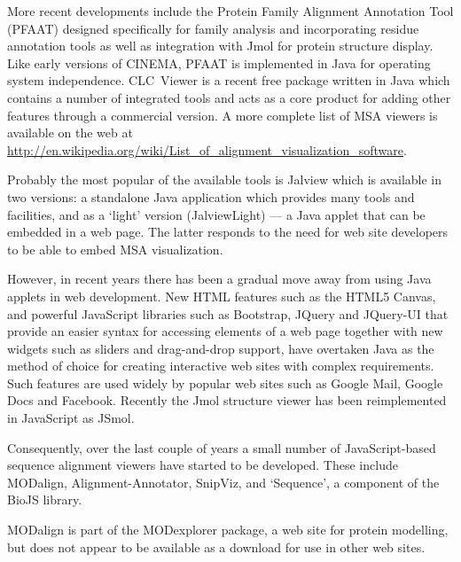 \documentclass[a4]{article}
\begin{document}
More recent developments include the Protein Family Alignment
Annotation Tool (PFAAT)\cite{johnson:pfaat} designed specifically for
family analysis and incorporating residue annotation tools as well as
integration with Jmol for protein structure display. Like early
versions of CINEMA, PFAAT is implemented in Java for operating system
independence. CLC~Viewer is a recent free package written in Java
which contains a number of integrated tools and acts as a core product
for adding other features through a commercial version.  A more
complete list of MSA viewers is available on the web at
\url{http://en.wikipedia.org/wiki/List_of_alignment_visualization_software}.

Probably the most popular of the available tools is
Jalview\cite{clamp:jalview} which is available in two versions: a
standalone Java application which provides many tools and facilities,
and as a `light' version (JalviewLight) --- a Java applet that can be
embedded in a web page. The latter responds to the need for web site
developers to be able to embed MSA visualization.

However, in recent years there has been a gradual move away from using
Java applets in web development. New HTML features such as the HTML5
Canvas, and powerful JavaScript libraries such as Bootstrap, JQuery
and JQuery-UI that provide an easier syntax for accessing elements of
a web page together with new widgets such as sliders and drag-and-drop
support, have overtaken Java as the method of choice for creating
interactive web sites with complex requirements.  Such features are
used widely by popular web sites such as Google Mail, Google Docs and
Facebook.  Recently the Jmol structure viewer has been reimplemented
in JavaScript as JSmol.

Consequently, over the last couple of years a small number of
JavaScript-based sequence alignment viewers have started to be
developed. These include MODalign\cite{barbato:modalign},
Alignment-Annotator\cite{gille:2014aa}, SnipViz\cite{jaschob:2014},
and `Sequence', a component of the BioJS library\cite{gomez:2014}.

MODalign is part of the MODexplorer package\cite{kosinski:2013}, a web
site for protein modelling, but does not appear to be available as a
download for use in other web sites. 
\end{document}
